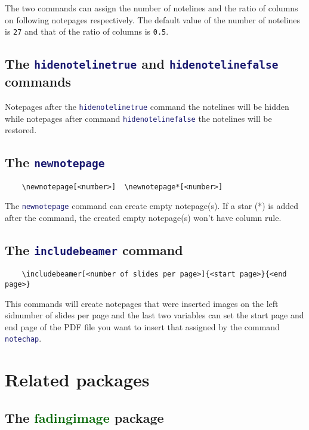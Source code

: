 \documentclass[11pt,svgnames]{article}
\def\pkg#1{\textcolor{DarkGreen}{\textsf{#1}}}
\def\cmd#1{\textcolor{MidnightBlue}{\texttt{\string#1}}}
\begin{document}
The two commands can assign the number of notelines and the ratio of columns on following notepages respectively. The default value of the number of notelines is \verb|27| and that of the ratio of columns is \verb|0.5|.

\subsection{The \cmd{hidenotelinetrue} and \cmd{hidenotelinefalse} commands}

Notepages after the \cmd{hidenotelinetrue} command the notelines will be hidden while notepages after command \cmd{hidenotelinefalse} the notelines will be restored.

\subsection{The \cmd{newnotepage}}

\begin{verbatim}
    \newnotepage[<number>]  \newnotepage*[<number>]
\end{verbatim}

The \cmd{newnotepage} command can create empty notepage(s). If a star (*) is added after the command, the created empty notepage(s) won't have column rule.

\subsection{The \cmd{includebeamer} command}

\begin{verbatim}
    \includebeamer[<number of slides per page>]{<start page>}{<end page>}
\end{verbatim}

This commands will create notepages that were inserted images on the left sidnumber of slides per page and the last two variables can set the start page and end page of the PDF file you want to insert that assigned by the command \cmd{notechap}.

\appendix
\section{Related packages}

\subsection{The \pkg{fadingimage} package}
\end{document}
